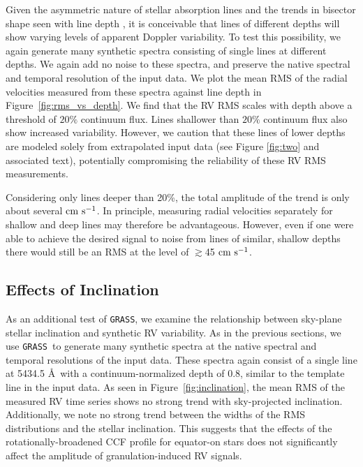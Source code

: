 \documentclass[twocolumn]{aastex63}
\newcommand{\cms}{\ {\rm cm\ s}^{-1}}
\newcommand{\grass}{\texttt{GRASS}}
\newcommand{\revise}[1]{#1}
\begin{document}
Given the asymmetric nature of stellar absorption lines \revise{and the trends in bisector shape seen with line depth \citep{Gray2008}}, it is conceivable that lines of different depths \revise{will} show varying levels of apparent Doppler variability. To test this possibility, we again generate many synthetic spectra consisting of single lines at different depths. We again add no noise to these spectra, and preserve the native spectral and temporal resolution of the input data. We plot the \revise{mean} RMS of the radial velocities measured from these spectra against line depth in Figure~\ref{fig:rms_vs_depth}. We find that the RV RMS scales with depth above a threshold of $20\%$ continuum flux. Lines shallower than $20\%$ continuum flux also show increased variability. However, we caution that these lines of lower depths are modeled solely from extrapolated input data \revise{(see Figure \ref{fig:two} and associated text)}, potentially compromising the reliability of these RV RMS measurements. \par 

\revise{Considering only lines deeper than 20\%, the total amplitude of the trend is only about several$\cms$. In principle, measuring radial velocities separately for shallow and deep lines may therefore be advantageous. However, even if one were able to achieve the desired signal to noise from lines of similar, shallow depths there would still be an RMS at the level of $\gtrsim$45$\cms$.} \par

\subsection{Effects of Inclination} \label{subsec:inc}


As an additional test of \grass, we examine the relationship between sky-plane stellar inclination and synthetic RV variability. As in the previous sections, we use \grass\ to generate many synthetic spectra at the native spectral and temporal resolutions of the input data. These spectra again consist of a single line at 5434.5 \AA\ with a continuum-normalized depth of 0.8, similar to the template line in the input data. As seen in Figure~\ref{fig:inclination}, the \revise{mean} RMS of the measured RV \revise{time series} shows no strong trend with sky-projected inclination. Additionally, we note no strong trend between the \revise{widths} of the RMS \revise{distributions} and the stellar inclination. This suggests that the effects of the rotationally-broadened CCF profile for equator-on stars does not significantly affect the amplitude of granulation-induced RV signals. \par 
\end{document}

